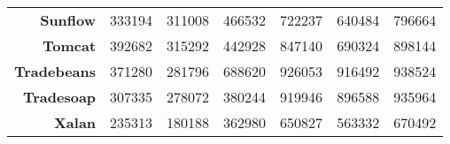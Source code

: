 \begin{table}[!h]
{\begin{tabular}{rcccccc}
      \textbf{Sunflow}     & 333194           & 311008           & 466532           & 722237           & 640484           & 796664           \\
      \textbf{Tomcat}      & 392682           & 315292           & 442928           & 847140           & 690324           & 898144           \\
      \textbf{Tradebeans}  & 371280           & 281796           & 688620           & 926053           & 916492           & 938524           \\
      \textbf{Tradesoap}   & 307335           & 278072           & 380244           & 919946           & 896588           & 935964           \\
      \textbf{Xalan}       & 235313           & 180188           & 362980           & 650827           & 563332           & 670492          
    \end{tabular}
  }
\end{table}
